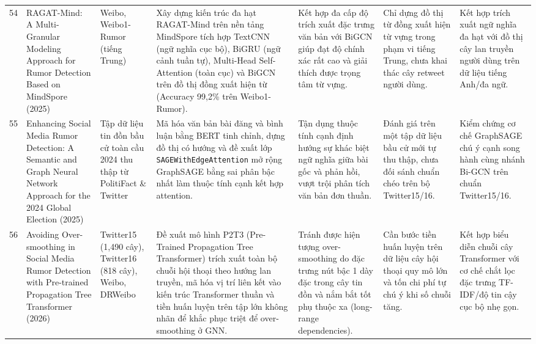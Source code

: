 \documentclass[11pt,a4paper]{extreport}
\begin{document}
\begin{landscape}
\begin{longtable}{@{}C{0.6cm}p{3.6cm}p{2.7cm}p{4.8cm}p{3.6cm}p{3.6cm}p{3.6cm}@{}}
54 & RAGAT-Mind: A Multi-Granular Modeling Approach for Rumor Detection Based on MindSpore (2025) \cite{qin_ragat-mind_2025} & Weibo, Weibo1-Rumor (tiếng Trung) & Xây dựng kiến trúc đa hạt RAGAT-Mind trên nền tảng MindSpore tích hợp TextCNN (ngữ nghĩa cục bộ), BiGRU (ngữ cảnh tuần tự), Multi-Head Self-Attention (toàn cục) và BiGCN trên đồ thị đồng xuất hiện từ (Accuracy 99,2\% trên Weibo1-Rumor). & Kết hợp đa cấp độ trích xuất đặc trưng văn bản với BiGCN giúp đạt độ chính xác rất cao và giải thích được trọng tâm từ vựng. & Chỉ dựng đồ thị từ đồng xuất hiện từ vựng trong phạm vi tiếng Trung, chưa khai thác cây retweet người dùng. & Kết hợp trích xuất ngữ nghĩa đa hạt với đồ thị cây lan truyền người dùng trên dữ liệu tiếng Anh/đa ngữ. \\ 

55 & Enhancing Social Media Rumor Detection: A Semantic and Graph Neural Network Approach for the 2024 Global Election (2025) \cite{yan_enhancing_2025} & Tập dữ liệu tin đồn bầu cử toàn cầu 2024 thu thập từ PolitiFact \& Twitter & Mã hóa văn bản bài đăng và bình luận bằng BERT tinh chỉnh, dựng đồ thị có hướng và đề xuất lớp \texttt{SAGEWithEdgeAttention} mở rộng GraphSAGE bằng sai phân bậc nhất làm thuộc tính cạnh kết hợp attention. & Tận dụng thuộc tính cạnh định hướng sự khác biệt ngữ nghĩa giữa bài gốc và phản hồi, vượt trội phân tích văn bản đơn thuần. & Đánh giá trên một tập dữ liệu bầu cử mới tự thu thập, chưa đối sánh chuẩn chéo trên bộ Twitter15/16. & Kiểm chứng cơ chế GraphSAGE chú ý cạnh song hành cùng nhánh Bi-GCN trên chuẩn Twitter15/16. \\ 

56 & Avoiding Over-smoothing in Social Media Rumor Detection with Pre-trained Propagation Tree Transformer (2026) \cite{cui_avoiding_2026} & Twitter15 (1,490 cây), Twitter16 (818 cây), Weibo, DRWeibo & Đề xuất mô hình P2T3 (Pre-Trained Propagation Tree Transformer) trích xuất toàn bộ chuỗi hội thoại theo hướng lan truyền, mã hóa vị trí liên kết vào kiến trúc Transformer thuần và tiền huấn luyện trên tập lớn không nhãn để khắc phục triệt để over-smoothing ở GNN. & Tránh được hiện tượng over-smoothing do đặc trưng nút bậc 1 dày đặc trong cây tin đồn và nắm bắt tốt phụ thuộc xa (long-range dependencies). & Cần bước tiền huấn luyện trên dữ liệu cây hội thoại quy mô lớn và tốn chi phí tự chú ý khi số chuỗi tăng. & Kết hợp biểu diễn chuỗi cây Transformer với cơ chế chắt lọc đặc trưng TF-IDF/độ tin cậy cục bộ nhẹ gọn. \\ 


\end{longtable}
\end{landscape}
\end{document}
